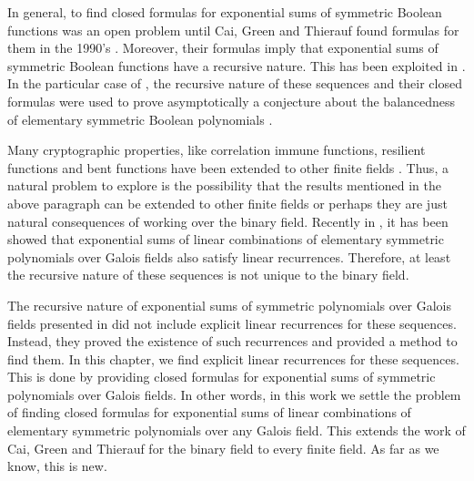 In general, to find closed formulas for exponential sums of symmetric Boolean functions was an open problem until Cai, Green and Thierauf found formulas for them in the 1990's \cite{cai}. 
Moreover, their formulas imply that exponential sums of symmetric Boolean functions have a recursive nature.  This has been exploited in \cite{cgm3, cm1, cm2, cm3, cusick4}.   In the particular case of \cite{cm1}, the recursive nature of these sequences and their closed formulas were used to prove asymptotically a conjecture about the balancedness of elementary symmetric Boolean polynomials \cite{cusick2}.  


Many cryptographic properties, like correlation immune functions, resilient functions and bent functions have been extended to other finite fields \cite{fengliu, hg, KScW, licusick1, licusick2, llm}.
Thus, a natural problem to explore is the possibility that the results mentioned in the above paragraph can be extended to other finite fields or perhaps they are just natural consequences of working over the binary field. 
Recently in \cite{ccms}, it has been showed that exponential sums of linear combinations of elementary symmetric polynomials over Galois fields also satisfy linear recurrences.  Therefore, at least the recursive nature of these sequences is 
not unique to the binary field.  

The recursive nature of exponential sums of symmetric polynomials over Galois fields presented in \cite{ccms} did not include explicit linear recurrences for these sequences.  Instead, they proved the existence of such recurrences and provided a method to find them.  In this chapter, we find explicit linear recurrences for these sequences.  This is done by providing closed formulas for exponential sums of symmetric polynomials over Galois fields. In other words, in this work we settle the problem of finding closed formulas for exponential sums of linear combinations of elementary symmetric polynomials over any Galois field.  This extends the work of Cai, Green and Thierauf for the binary field \cite{cai} to every finite field.  As far as we know, this is new.  

